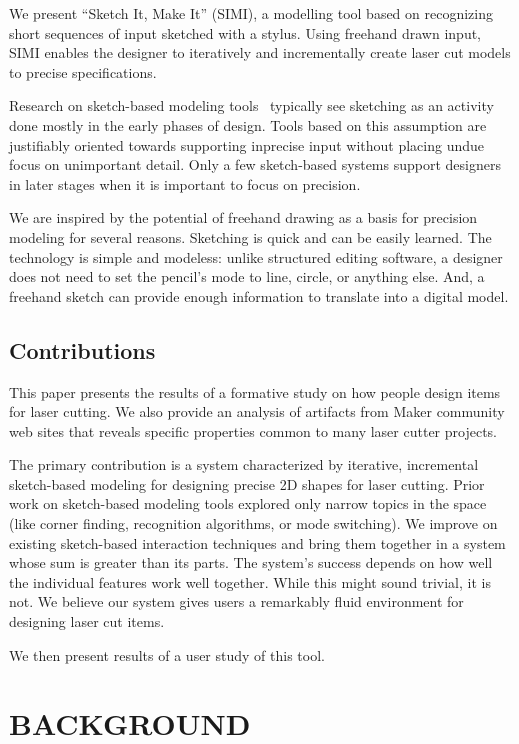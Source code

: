 \documentclass{article}
\begin{document}
We present ``Sketch It, Make It'' (SIMI), a modelling tool based on
recognizing short sequences of input sketched with a stylus. Using
freehand drawn input, SIMI enables the designer to iteratively and
incrementally create laser cut models to precise specifications.

Research on sketch-based modeling tools~\cite{johnson-sketch-review}
typically see sketching as an activity done mostly in the early phases
of design. Tools based on this assumption are justifiably oriented
towards supporting inprecise input without placing undue focus on
unimportant detail. Only a few sketch-based systems support designers
in later stages when it is important to focus on precision. 

We are inspired by the potential of freehand drawing as a basis for
precision modeling for several reasons. Sketching is quick and can be
easily learned. The technology is simple and modeless: unlike
structured editing software, a designer does not need to set the
pencil's mode to line, circle, or anything else. And, a freehand
sketch can provide enough information to translate into a digital
model.

\subsection{Contributions}

This paper presents the results of a formative study on how people
design items for laser cutting. We also provide an analysis of
artifacts from Maker community web sites that reveals specific
properties common to many laser cutter projects.

The primary contribution is a system characterized by iterative,
incremental sketch-based modeling for designing precise 2D shapes
for laser cutting. Prior work on sketch-based modeling tools explored
only narrow topics in the space (like corner finding, recognition
algorithms, or mode switching). We improve on existing sketch-based
interaction techniques and bring them together in a system whose sum
is greater than its parts. The system's success depends on how well
the individual features work well together. While this might sound
trivial, it is not. We believe our system gives users a remarkably
fluid environment for designing laser cut items.

We then present results of a user study of this tool. %

\section{BACKGROUND}
\end{document}
